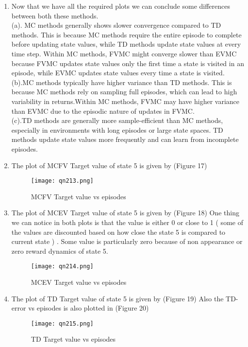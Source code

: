 \documentclass[a4 paper]{article}
\begin{document}
\begin{enumerate}
\item Now that we have all the required plots we can conclude some differences between both these methods. \\
 (a). MC methods generally shows slower convergence compared to TD methods. This is because MC methods require the entire episode to complete before updating state values, while TD methods update state values at every time step.
Within MC methods, FVMC might converge slower than EVMC because FVMC updates state values only the first time a state is visited in an episode, while EVMC updates state values every time a state is visited.\\
(b).MC methods typically have higher variance than TD methods. This is because MC methods rely on sampling full episodes, which can lead to high variability in returns.Within MC methods, FVMC may have higher variance than EVMC due to the episodic nature of updates in FVMC.\\
(c).TD methods are generally more sample-efficient than MC methods, especially in environments with long episodes or large state spaces. TD methods update state values more frequently and can learn from incomplete episodes.



\item The plot of MCFV Target value of state 5 is given by (Figure 17)
\begin{figure}[h!]
    \centering
    \texttt{[image: qn213.png]}
    \caption{ MCFV Target value vs episodes }
\end{figure}

\item The plot of MCEV Target value of state 5 is given by (Figure 18)
One thing we can notice in both plots is that the value is either 0 or close to 1 ( some of the values are discounted based on how close the state 5 is compared to current state ) . Some value is particularly zero because of non appearance or zero reward dynamics of state 5. 
\begin{figure}[h!]
    \centering
    \texttt{[image: qn214.png]}
    \caption{ MCEV Target value vs episodes }
\end{figure}

\item The plot of TD Target value of state 5 is given by (Figure 19)
Also the TD-error vs episodes is also plotted in (Figure 20)
\begin{figure}[h!]
    \centering
    \texttt{[image: qn215.png]}
    \caption{  TD Target value vs episodes }
\end{figure}


\end{enumerate}
\end{document}
